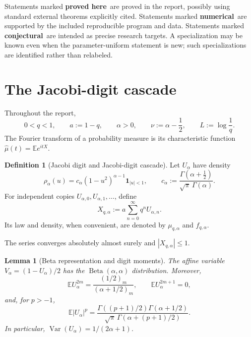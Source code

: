 \documentclass[11pt]{article}
\newtheorem{lemma}[theorem]{Lemma}
\theoremstyle{definition}
\newtheorem{definition}[theorem]{Definition}
\theoremstyle{remark}
\newcommand{\E}{\mathbb{E}}
\newcommand{\Var}{\operatorname{Var}}
\newcommand{\poch}[2]{\left(#1\right)_{#2}}
\newcommand{\statusP}{\textcolor{green!35!black}{\textbf{proved here}}}
\newcommand{\statusC}{\textcolor{orange!70!black}{\textbf{conjectural}}}
\newcommand{\statusN}{\textcolor{blue!55!black}{\textbf{numerical}}}
\begin{document}
Statements marked \statusP\ are proved in the report, possibly using standard
external theorems explicitly cited.  Statements marked \statusN\ are supported
by the included reproducible program and data.  Statements marked
\statusC\ are intended as precise research targets.  A specialization may be
known even when the parameter-uniform statement is new; such specializations
are identified rather than relabeled.

\section{The Jacobi-digit cascade}
\label{sec:definition}

Throughout the report,
\[
 0<q<1,\qquad a:=1-q,\qquad \alpha>0,
 \qquad \nu:=\alpha-\frac12,
 \qquad L:=\log\frac1q.
\]
The Fourier transform of a probability measure is its characteristic
function \(\widehat\mu(t)=\E e^{itX}\).

\begin{definition}[Jacobi digit and Jacobi-digit cascade]
Let \(U_\alpha\) have density
\begin{equation}
 \rho_\alpha(u)
 =c_\alpha(1-u^2)^{\alpha-1}\mathbf1_{|u|<1},
 \qquad
 c_\alpha:=\frac{\Gamma(\alpha+\tfrac12)}{\sqrt\pi\,\Gamma(\alpha)}.
 \label{eq:digit-density}
\end{equation}
For independent copies \(U_{\alpha,0},U_{\alpha,1},\ldots\), define
\begin{equation}
 X_{q,\alpha}:=a\sum_{n=0}^{\infty}q^nU_{\alpha,n}.
 \label{eq:cascade-definition}
\end{equation}
Its law and density, when convenient, are denoted by
\(\mu_{q,\alpha}\) and \(f_{q,\alpha}\).
\end{definition}

The series converges absolutely almost surely and \(|X_{q,\alpha}|\le1\).

\begin{lemma}[Beta representation and digit moments]
\label{lem:digit-moments}
The affine variable \(V_\alpha=(1-U_\alpha)/2\) has the
\(\operatorname{Beta}(\alpha,\alpha)\) distribution.  Moreover,
\begin{equation}
 \E U_\alpha^{2m}=\frac{\poch{1/2}{m}}{\poch{\alpha+1/2}{m}},
 \qquad
 \E U_\alpha^{2m+1}=0,
 \label{eq:digit-even-moment}
\end{equation}
and, for \(p>-1\),
\begin{equation}
 \E|U_\alpha|^p
 =\frac{\Gamma((p+1)/2)\Gamma(\alpha+1/2)}
 {\sqrt\pi\,\Gamma(\alpha+(p+1)/2)}.
 \label{eq:digit-absolute-moment}
\end{equation}
In particular, \(\Var(U_\alpha)=1/(2\alpha+1)\).
\end{lemma}
\end{document}
